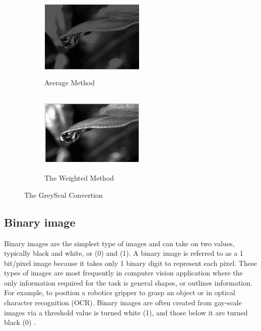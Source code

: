 \begin{enumerate}
\begin{figure}[h]
                        \hfill
                        \begin{subfigure}[b]{0.3\textwidth}
                                \centering
                                \includegraphics[width=5cm,height=4cm]{chapiter1/figures/avarage-grey.png}
                                \caption{Average Method}
                        \end{subfigure}
                        \hfill
                        \begin{subfigure}[b]{0.3\textwidth}
                                \centering
                                \includegraphics[width=5cm,height=4cm]{chapiter1/figures/withed-grey.png}
                                \caption{The Weighted Method}
                        \end{subfigure}
                        \caption{The GreyScal Convertion }
                        \label{fig:figure1.6}
                \end{figure}
        \end{enumerate}
\subsection{Binary image}
Binary images are the simplest type of images and can take on two values,
typically black and white, or (0) and (1).
A binary image is referred to as a 1 bit/pixel image because it takes only 1
binary digit to represent each pixel.
These types of images are most frequently in computer vision application where the
only information required for the task is general shapes, or outlines information.
For example, to position a robotics gripper to grasp an object or in optical character
recognition (OCR). Binary images are often created from gay-scale images via a threshold
value is turned white (1), and those below it are turned black (0) \cite{1.8}.


